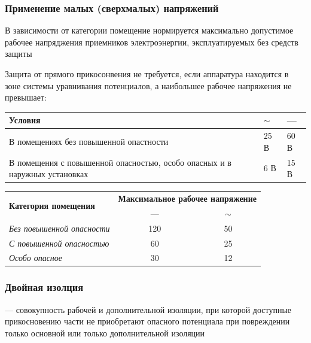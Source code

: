 \documentclass[a4paper, 14pt]{extarticle}
\begin{document}
\subsubsection{Применение малых (сверхмалых) напряжений}
В зависимости от категории помещение нормируется максимально допустимое рабочее напряджения приемников электроэнергии, эксплуатируемых без средств защиты

Защита от прямого прикосонвения не требуется, если аппаратура находится в зоне системы уравнивания потенциалов, а наибольшее рабочее напряжения не превышает:

\begin{table}[h]
\begin{tabularx}{\textwidth}{@{}Xll@{}}
\toprule
\textbf{Условия} & $\sim$ & --- \\ \midrule
В помещениях без повышенной опастности & 25 В & 60 В \\
В помещения с повышенной опасностью, особо опасных и в наружных установках & 6 В & 15 В \\ \bottomrule
\end{tabularx}
\end{table}

\begin{table}[h]
\begin{tabularx}{\textwidth}{@{}Xcc@{}}
\toprule
\multirow{2}{*}{\textbf{Категория помещения}} & \multicolumn{2}{l}{\textbf{Максимальное рабочее напряжение}} \\ \cmidrule(l){2-3} 
                                              & ---                         & $\sim$                         \\ \midrule
\textit{Без повышенной опасности}             & 120                         & 50                             \\
\textit{С повышенной опасностью}              & 60                          & 25                             \\
\textit{Особо опасное}                        & 30                          & 12                             \\ \bottomrule
\end{tabularx}
\end{table}

\subsubsection{Двойная изолция}
 --- совокупность рабочей и дополнительной изоляции, при которой доступные прикосновению части не приобретают опасного потенциала при повреждении только основной или только дополнительной изоляции 
\end{document}
